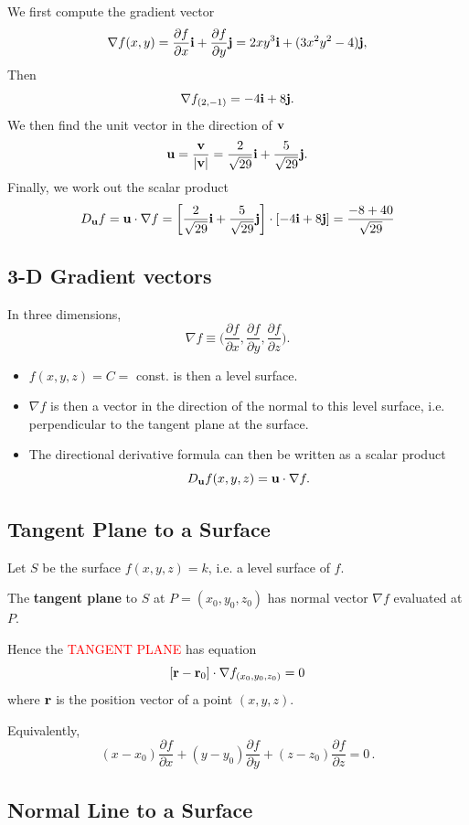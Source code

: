 \documentclass{article}
\begin{document}
We first compute the gradient vector
$$
\nabla f (x,y) = \frac{\partial f} {\partial x} {\bf i}+
\frac{\partial f} {\partial y} {\bf j}=2xy^3 {\bf
i}+(3x^2y^2-4){\bf j},
$$
Then
$$
\nabla f_{(2,-1)} = -4 {\bf i}+8{\bf j}.
$$
We then find the unit vector in the direction of ${\bf v}$
$$
{\bf u} = \frac{\bf v} {|{\bf v}|}= \frac{2}{\sqrt{29}}{\bf i} +
 \frac{5}{\sqrt{29}} {\bf j}.
$$
Finally, we work out the scalar product
$$
D_{\bf u} f = {\bf u} \cdot \nabla f=\left[
\frac{2}{\sqrt{29}}{\bf i} +
 \frac{5}{\sqrt{29}} {\bf j} \right] \cdot \left[ -4 {\bf i}+8{\bf j}
 \right]=
\frac{-8+40}{\sqrt{29}}
$$


\subsection{3-D Gradient vectors}

In three dimensions,
$$
\nabla f \equiv \Bigr(\frac{\partial f} {\partial x},
\frac{\partial f} {\partial y}, \frac{\partial f} {\partial z}
\Bigr).
$$
\begin{itemize}
\item
$f(x,y,z)=C=$ const. is then a level surface. 
\item
$\nabla f$ is then a
vector in the direction of the normal to this level surface, i.e.
perpendicular to the tangent plane at the surface. 
\item
The directional derivative formula can then be written as a scalar product
$$
D_{\bf u} f(x,y,z) = {\bf u} \cdot \nabla f.
$$
\end{itemize}

\subsection{Tangent Plane to a Surface} 

Let $S$ be the surface $f(x,y,z)=k$, i.e. a level surface of $f$.

The \textbf{tangent plane} to $S$ at $P = (x_0,y_0,z_0)$ 
has normal vector $ \nabla f$ evaluated at $P$.

Hence the \textcolor{red}{TANGENT PLANE} has equation
$$
\left[ {\bf r}-{\bf r}_0 \right] \cdot \nabla f_{(x_0,y_0,z_0)}=0
$$
where ${\bf r}$ is the position vector of a point $(x,y,z)$. 

Equivalently,
$$
(x-x_0) \frac{\partial f} {\partial x} +(y-y_0) \frac{\partial f}
{\partial y} + (z-z_0) \frac{\partial f} {\partial z}=0\,.
$$

\subsection{Normal Line to a Surface} 
\end{document}
